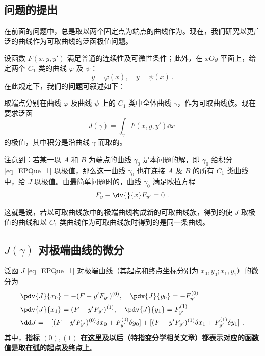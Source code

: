 

\subsection{问题的提出}\label{sub_EPQue_1}在前面的问题中，总是取以两个固定点为端点的曲线作为。现在，我们研究以更广泛的曲线作为可取曲线的泛函极值问题。

设函数 $F(x,y,y')$ 满足普通的连续性及可微性条件；此外，在 $xOy$ 平面上，给定两个 $C_1$ 类的曲线 $\varphi$ 及 $\psi$：
\begin{equation}
y=\varphi(x),\quad y=\psi(x)~.
\end{equation}
在此规定下，我们的\textbf{问题}可叙述如下：

取端点分别在曲线 $\varphi$ 及曲线 $\psi$ 上的 $C_1$ 类中全体曲线 $\gamma$，作为可取曲线族。现在要求泛函
\begin{equation}\label{eq_EPQue_1}
J(\gamma)=\int_\gamma F(x,y,y')\dd x~
\end{equation}
的极值，其中积分是沿曲线 $\gamma$ 而取的。

注意到：若某一以 $A$ 和 $B$ 为端点的曲线 $\gamma_0$ 是本问题的解，即 $\gamma_0$ 给积分\autoref{eq_EPQue_1} 以极值，那么这一曲线 $\gamma_0$ 也在连接 $A$ 及 $B$ 的所有 $C_1$ 类曲线中，给 $J$ 以极值。由最简单问题时的，曲线 $\gamma_0$ 满足欧拉方程
\begin{equation}
F_y-\dv{}{x}F_{y'}=0~.
\end{equation}

这就是说，若以可取曲线族中的极端曲线构成新的可取曲线族，得到的使 $J$ 取极值的曲线和以 $C_1$ 类曲线作为可取曲线族时得到的是同一条曲线。
\subsection{$J(\gamma)$ 对极端曲线的微分} 
\begin{theorem}{}\label{the_EPQue_1}
泛函 $J$ \autoref{eq_EPQue_1} 对极端曲线（其起点和终点坐标分别为 $x_0,y_0;x_1,y_1$）的微分为
\begin{equation}\label{eq_EPQue_5}
\begin{aligned}
&\pdv{J}{x_0}=-(F-y'F_{y'})^{(0)},\quad \pdv{J}{y_0}=-F_{y'}^{(0)}\\
&\pdv{J}{x_1}=(F-y'F_{y'})^{(1)},\quad \pdv{J}{y_1}=F_{y'}^{(1)}\\
&\dd J=-[(F-y'F_{y'})^{(0)}\delta {x_0}+ F_{y'}^{(0)}\delta y_0]+[(F-y'F_{y'})^{(1)}\delta {x_1}+F_{y'}^{(1)}\delta y_1]~.
\end{aligned}
\end{equation}
其中，\textbf{指标 ${(0)},{(1)}$ 在这里及以后（特指变分学相关文章）都表示对应的函数值是取在弧的起点及终点上}。
\end{theorem}
